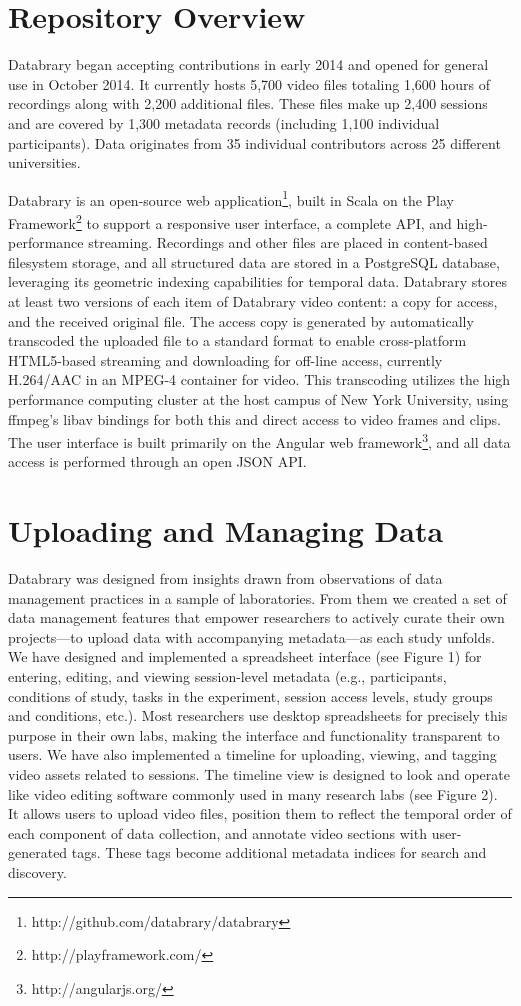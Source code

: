 \documentclass{sig-alternate}
\begin{document}
\section{Repository Overview}
Databrary began accepting contributions in early 2014 and opened for general use in October 2014.
It currently hosts 5,700 video files totaling 1,600 hours of recordings along with 2,200 additional files.
These files make up 2,400 sessions and are covered by 1,300 metadata records (including 1,100 individual participants).
Data originates from 35 individual contributors across 25 different universities.

Databrary is an open-source web application\footnote{http://github.com/databrary/databrary}, built in Scala on the Play Framework\footnote{http://playframework.com/} to support a responsive user interface, a complete API, and high-performance streaming.
Recordings and other files are placed in content-based filesystem storage, and all structured data are stored in a PostgreSQL database, leveraging its geometric indexing capabilities for temporal data.
Databrary stores at least two versions of each item of Databrary video content: a copy for access, and the received original file.
The access copy is generated by automatically transcoded the uploaded file to a standard format to enable cross-platform HTML5-based streaming and downloading for off-line access, currently H.264/AAC in an MPEG-4 container for video.
This transcoding utilizes the high performance computing cluster at the host campus of New York University, using ffmpeg's libav bindings for both this and direct access to video frames and clips.
The user interface is built primarily on the Angular web framework\footnote{http://angularjs.org/}, and all data access is performed through an open JSON API.

\section{Uploading and Managing Data}

Databrary was designed from insights drawn from observations of data management practices in a sample of laboratories. 
From them we created a set of data management features that empower researchers to actively curate their own projects---to upload data with accompanying metadata---as each study unfolds. 
We have designed and implemented a spreadsheet interface (see Figure 1) for entering, editing, and viewing session-level metadata (e.g., participants, conditions of study, tasks in the experiment, session access levels, study groups and conditions, etc.). 
Most researchers use desktop spreadsheets for precisely this purpose in their own labs, making the interface and functionality transparent to users. 
We have also implemented a timeline for uploading, viewing, and tagging video assets related to sessions.  The timeline view is designed to look and operate like video editing software commonly used in many research labs (see Figure 2).
It allows users to upload video files, position them to reflect the temporal order of each component of data collection, and annotate video sections with user-generated tags. 
These tags become additional metadata indices for search and discovery. 
\end{document}
